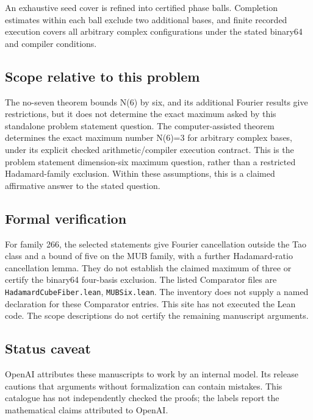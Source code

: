 \documentclass[11pt]{article}
\begin{document}
An exhaustive seed cover is refined into certified phase balls. Completion estimates within each ball exclude two additional bases, and finite recorded execution covers all arbitrary complex configurations under the stated binary64 and compiler conditions.

\subsection{Scope relative to this problem}
The no-seven theorem bounds N(6) by six, and its additional Fourier results give restrictions, but it does not determine the exact maximum asked by this standalone problem statement question. The computer-assisted theorem determines the exact maximum number N(6)=3 for arbitrary complex bases, under its explicit checked arithmetic/compiler execution contract. This is the problem statement dimension-six maximum question, rather than a restricted Hadamard-family exclusion. Within these assumptions, this is a claimed affirmative answer to the stated question.

\subsection{Formal verification}
For family 266, the selected statements give Fourier cancellation outside the Tao class and a bound of five on the MUB family, with a further Hadamard-ratio cancellation lemma. They do not establish the claimed maximum of three or certify the binary64 four-basis exclusion. The listed Comparator files are \texttt{HadamardCubeFiber.lean}, \texttt{MUBSix.lean}. The inventory does not supply a named declaration for these Comparator entries. This site has not executed the Lean code. The scope descriptions do not certify the remaining manuscript arguments.

\subsection{Status caveat}
OpenAI attributes these manuscripts to work by an internal model. Its release cautions that arguments without formalization can contain mistakes. This catalogue has not independently checked the proofs; the labels report the mathematical claims attributed to OpenAI.
\end{document}
